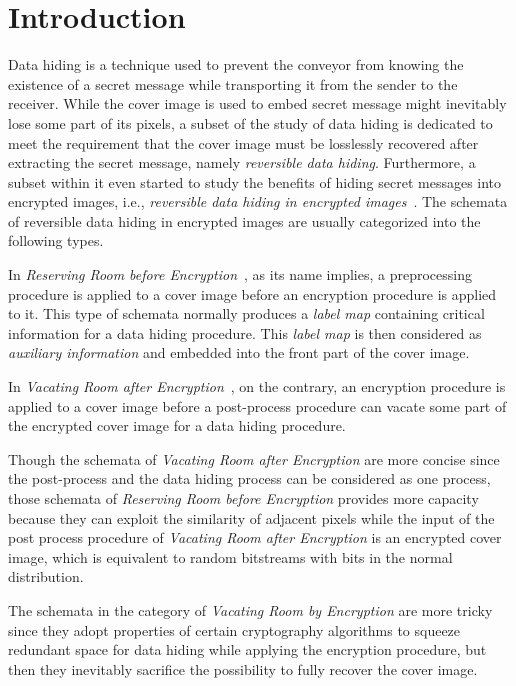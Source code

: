 \section{Introduction}
\label{sec:intro}

Data hiding is a technique used to prevent the conveyor from knowing the existence of a secret message while transporting it from the sender to the receiver. 
While the cover image is used to embed secret message might inevitably lose some part of its pixels, a subset of the study of data hiding is dedicated to meet the requirement that the cover image must be losslessly recovered after extracting the secret message, namely \emph{reversible data hiding}. 
Furthermore, a subset within it even started to study the benefits of hiding secret messages into encrypted images, i.e., \emph{reversible data hiding in encrypted images}~\cite{Zhang2011, Liu2020, Jain2021, Di2018}.
The schemata of reversible data hiding in encrypted images are usually categorized into the following types. 

In \emph{Reserving Room before Encryption}~\cite{Ma2013, Agrawal2017, Liao2015}, as its name implies, a preprocessing procedure is applied to a cover image before an encryption procedure is applied to it. 
This type of schemata normally produces a \emph{label map} containing critical information for a data hiding procedure. 
This \emph{label map} is then considered as \emph{auxiliary information} and embedded into the front part of the cover image.

In \emph{Vacating Room after Encryption}~\cite{Puech2008, Wu2019, Li2018}, on the contrary, an encryption procedure is applied to a cover image before a post-process procedure can vacate some part of the encrypted cover image for a data hiding procedure.

Though the schemata of \emph{Vacating Room after Encryption} are more concise since the post-process and the data hiding process can be considered as one process, 
those schemata of \emph{Reserving Room before Encryption} provides more capacity because they can exploit the similarity of adjacent pixels while the input of the post process procedure of \emph{Vacating Room after Encryption} is an encrypted cover image, which is equivalent to random bitstreams with bits in the normal distribution.

The schemata in the category of \emph{Vacating Room by Encryption}\cite{Liu2018, Yu2020} are more tricky since they adopt properties of certain cryptography algorithms to squeeze redundant space for data hiding while applying the encryption procedure, 
but then they inevitably sacrifice the possibility to fully recover the cover image.






